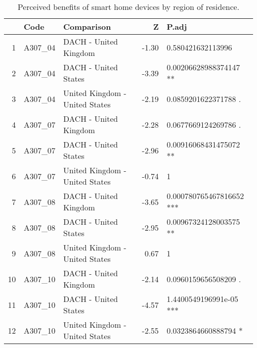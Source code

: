 \begin{table}[ht]
\centering
\begin{tabular}{rllrl}
  \hline
 & Code & Comparison & Z & P.adj \\ 
  \hline
1 & A307\_04 & DACH - United Kingdom & -1.30 & 0.580421632113996   \\ 
  2 & A307\_04 & DACH - United States & -3.39 & 0.00206628988374147 ** \\ 
  3 & A307\_04 & United Kingdom - United States & -2.19 & 0.0859201622371788 . \\ 
   \hline
4 & A307\_07 & DACH - United Kingdom & -2.28 & 0.0677669124269786 . \\ 
  5 & A307\_07 & DACH - United States & -2.96 & 0.00916068431475072 ** \\ 
  6 & A307\_07 & United Kingdom - United States & -0.74 & 1   \\ 
   \hline
7 & A307\_08 & DACH - United Kingdom & -3.65 & 0.000780765467816652 *** \\ 
  8 & A307\_08 & DACH - United States & -2.95 & 0.00967324128003575 ** \\ 
  9 & A307\_08 & United Kingdom - United States & 0.67 & 1   \\ 
   \hline
10 & A307\_10 & DACH - United Kingdom & -2.14 & 0.0960159656508209 . \\ 
  11 & A307\_10 & DACH - United States & -4.57 & 1.4400549196991e-05 *** \\ 
  12 & A307\_10 & United Kingdom - United States & -2.55 & 0.0323864660888794 * \\ 
   \hline
\end{tabular}
\caption{Perceived benefits of smart home devices by region of residence. } 
\label{RQ2_H3_BenefitSmartDevicesRegion}
\end{table}

